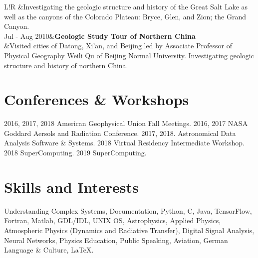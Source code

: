 \documentclass[10pt]{article}
\newcommand\VRule{\color{black}\vrule width 0.5pt}
\begin{document}
\begin{longtable}{L!{\VRule}R}
				   &{Investigating the geologic structure and history of the Great Salt Lake as well as the canyons of the Colorado Plateau: Bryce, Glen, and Zion; the Grand Canyon.}\\
				   Jul - Aug 2010&{\bf Geologic Study Tour of Northern China}\\
				   &{Visited cities of Datong, Xi'an, and Beijing led by Associate Professor of Physical Geography Weili Qu of Beijing Normal University. Investigating geologic structure and history of northern China.}\\[5pt]

				   \end{longtable}

				   \section*{Conferences \& Workshops}
				           2016, 2017, 2018 American Geophysical Union Fall Meetings. 2016, 2017 NASA Goddard Aersols and Radiation Conference. 2017, 2018. Astronomical Data Analysis Software \& Systems. 2018 Virtual Residency Intermediate Workshop. 2018 SuperComputing. 2019 SuperComputing.

						   \section*{Skills and Interests}

						   \begin{minipage}[ht]{1.0\textwidth}
						   Understanding Complex Systems, Documentation, Python, C, Java, TensorFlow, Fortran, Matlab, GDL/IDL, UNIX OS, Astrophysics, Applied Physics, Atmospheric Physics (Dynamics and Radiative Transfer), Digital Signal Analysis, Neural Networks, Physics Education, Public Speaking, Aviation, German Language \& Culture, \LaTeX.
						   \end{minipage}

						   
\end{document}
